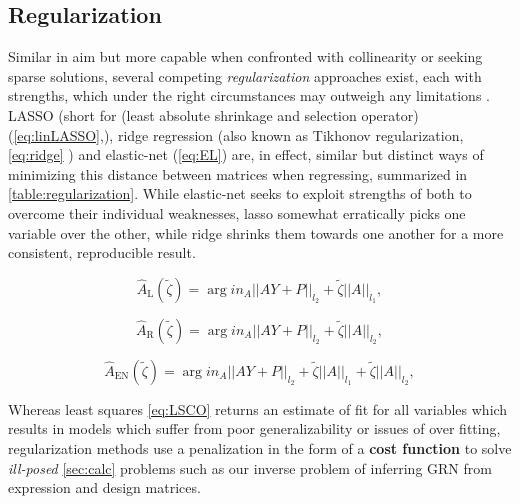 \subsection{Regularization}
\label{sec:reg}
Similar in aim but more capable when confronted with collinearity or seeking sparse solutions, several competing \emph{regularization} approaches exist, each with strengths, which under the right circumstances may outweigh any limitations \cite[p.69-73,661-668]{friedman2001elements}. LASSO (short for (least absolute shrinkage and selection operator) (\cref{eq:linLASSO},\cite{tibshirani1996regression}), ridge regression (also known as Tikhonov regularization, \cref{eq:ridge} \cite{hoerl1970ridge}) and elastic-net (\cref{eq:EL}\cite{zou2005regularization}) are, in effect, similar but distinct ways of minimizing this distance between matrices when regressing, summarized in \cref{table:regularization}. While elastic-net seeks to exploit strengths of both to overcome their individual weaknesses, lasso somewhat erratically picks one variable over the other, while ridge shrinks them towards one another for a more consistent, reproducible result.

 \begin{equation}\label{eq:linLASSO}
  \hat{A}_{\textrm{L}}(\tilde{\zeta}) = \arg in_{A} ||A Y+P||_{l_2} + \tilde{\zeta} ||A||_{l_1},
\end{equation}

 \begin{equation}\label{eq:ridge}
  \hat{A}_{\textrm{R}}(\tilde{\zeta}) = \arg in_{A} ||A Y+P||_{l_2} + \tilde{\zeta} ||A||_{l_2},
\end{equation}

 \begin{equation}\label{eq:EL}
  \hat{A}_{\textrm{EN}}(\tilde{\zeta}) = \arg in_{A} ||A Y+P||_{l_2} + \tilde{\zeta} ||A||_{l_1}+ \tilde{\zeta} ||A||_{l_2},
\end{equation}

Whereas least squares \cref{eq:LSCO} returns an estimate of fit for all variables which results in models which suffer from poor generalizability or issues of over fitting, regularization methods use a penalization in the form of a \textbf{cost function} to solve \emph{ill-posed} \cref{sec:calc} problems such as our inverse problem of inferring GRN from expression and design matrices.

